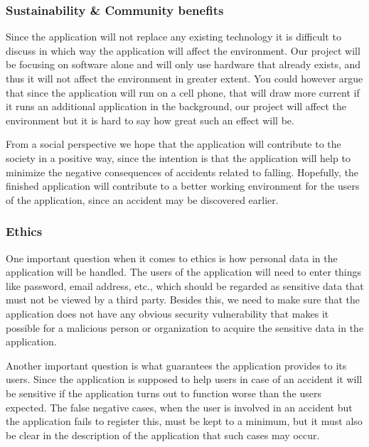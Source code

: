 \documentclass[12pt, a4paper, onecolumn]{article}
\begin{document}
		
		\subsubsection{Sustainability \& Community benefits}
		
		Since the application will not replace any existing technology it is difficult to discuss in which way the application will affect the environment. Our project will be focusing on software alone and will only use hardware that already exists, and thus it will not affect the environment in greater extent. You could however argue that since the application will run on a cell phone, that will draw more current if it runs an additional application in the background, our project will affect the environment but it is hard to say how great such an effect will be.
		
		From a social perspective we hope that the application will contribute to the society in a positive way, since the intention is that the application will help to minimize the negative consequences of accidents related to falling. Hopefully, the finished application will contribute to a better working environment for the users of the application, since an accident may be discovered earlier.  
		
		\subsubsection{Ethics}
		
		One important question when it comes to ethics is how personal data in the application will be handled. The users of the application will need to enter things like password, email address, etc., which should be regarded as sensitive data that must not be viewed by a third party. Besides this, we need to make sure that the application does not have any obvious security vulnerability that makes it possible for a malicious person or organization to acquire the sensitive data in the application.
		
		Another important question is what guarantees the application provides to its users. Since the application is supposed to help users in case of an accident it will be sensitive if the application turns out to function worse than the users expected. The false negative cases, when the user is involved in an accident but the application fails to register this, must be kept to a minimum, but it must also be clear in the description of the application that such cases may occur.
		
\end{document}
